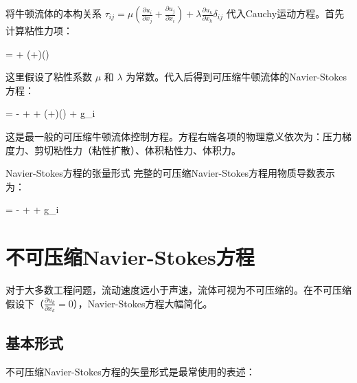 将牛顿流体的本构关系 $\tau_{ij} = \mu\left(\frac{\partial u_i}{\partial x_j} + \frac{\partial u_j}{\partial x_i}\right) + \lambda\frac{\partial u_k}{\partial x_k}\delta_{ij}$ 代入Cauchy运动方程。首先计算粘性力项：

\begin{myformula}
     = \mu{} + (\mu+\lambda)\left(\right)
\end{myformula}

这里假设了粘性系数 $\mu$ 和 $\lambda$ 为常数。代入后得到可压缩牛顿流体的Navier-Stokes方程：

\begin{myformula}
    \rho{} = - + \mu{} + (\mu+\lambda)\left(\right) + \rho g_i
\end{myformula}

这是最一般的可压缩牛顿流体控制方程。方程右端各项的物理意义依次为：压力梯度力、剪切粘性力（粘性扩散）、体积粘性力、体积力。

\begin{myTheorem}{Navier-Stokes方程的张量形式}
完整的可压缩Navier-Stokes方程用物质导数表示为：
\begin{myformula}
    \rho{} = - +  + \rho g_i
\end{myformula}
\end{myTheorem}

\section{不可压缩Navier-Stokes方程}

对于大多数工程问题，流动速度远小于声速，流体可视为不可压缩的。在不可压缩假设下（$\frac{\partial u_k}{\partial x_k}=0$），Navier-Stokes方程大幅简化。

\subsection{基本形式}

不可压缩Navier-Stokes方程的矢量形式是最常使用的表述：

